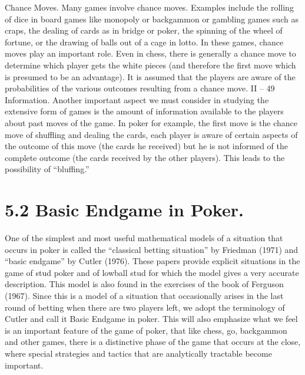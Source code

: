 Chance Moves. Many games involve chance moves. Examples include the rolling of
dice in board games like monopoly or backgammon or gambling games such as craps, the
dealing of cards as in bridge or poker, the spinning of the wheel of fortune, or the drawing
of balls out of a cage in lotto. In these games, chance moves play an important role. Even
in chess, there is generally a chance move to determine which player gets the white pieces
(and therefore the first move which is presumed to be an advantage). It is assumed that
the players are aware of the probabilities of the various outcomes resulting from a chance
move.
II – 49
Information. Another important aspect we must consider in studying the extensive
form of games is the amount of information available to the players about past moves of
the game. In poker for example, the first move is the chance move of shuffling and dealing
the cards, each player is aware of certain aspects of the outcome of this move (the cards he
received) but he is not informed of the complete outcome (the cards received by the other
players). This leads to the possibility of “bluffing.”

\section{5.2 Basic Endgame in Poker.} One of the simplest and most useful mathematical
models of a situation that occurs in poker is called the “classical betting situation” by
Friedman (1971) and “basic endgame” by Cutler (1976). These papers provide explicit
situations in the game of stud poker and of lowball stud for which the model gives a very
accurate description. This model is also found in the exercises of the book of Ferguson
(1967). Since this is a model of a situation that occasionally arises in the last round of
betting when there are two players left, we adopt the terminology of Cutler and call it
Basic Endgame in poker. This will also emphasize what we feel is an important feature of
the game of poker, that like chess, go, backgammon and other games, there is a distinctive
phase of the game that occurs at the close, where special strategies and tactics that are
analytically tractable become important.

